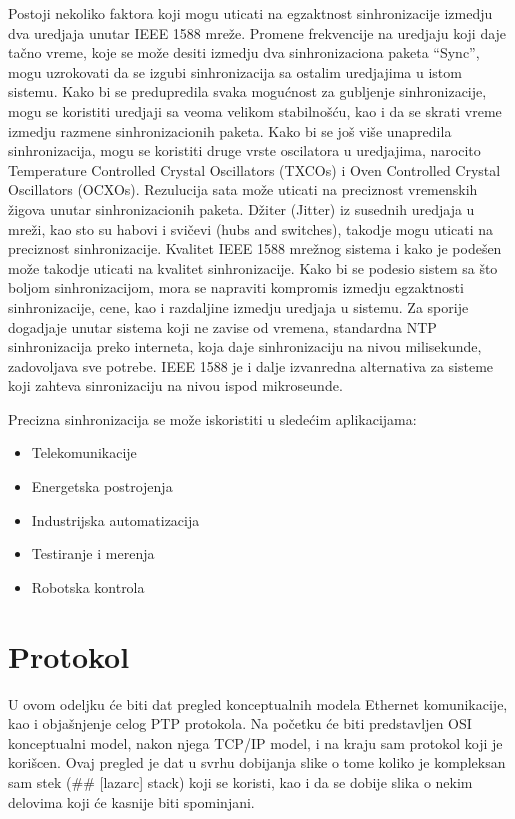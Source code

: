 \documentclass[a4paper,12pt, master]{etf}
\begin{document}
	Postoji nekoliko faktora koji mogu uticati na egzaktnost sinhronizacije 
	izmedju dva	uredjaja unutar IEEE 1588 mre\v{z}e. Promene frekvencije na 
	uredjaju koji daje ta\v{c}no vreme,	koje se mo\v{z}e desiti izmedju dva 
	sinhronizaciona paketa ``Sync'', mogu uzrokovati da se izgubi 
	sinhronizacija sa ostalim uredjajima u istom sistemu. Kako bi se 
	predupredila svaka mogu\'{c}nost za gubljenje sinhronizacije, mogu se 
	koristiti uredjaji sa veoma velikom	stabilno\v{s}\'{c}u, kao i da se skrati 
	vreme izmedju razmene sinhronizacionih paketa. Kako bi se jo\v{s} vi\v{s}e 
	unapredila sinhronizacija, mogu se koristiti druge vrste oscilatora u
	uredjajima, narocito Temperature Controlled Crystal Oscillators (TXCOs) i 
	Oven Controlled Crystal	Oscillators (OCXOs). Rezulucija sata mo\v{z}e 
	uticati na preciznost vremenskih \v{z}igova unutar sinhronizacionih paketa. 
	D\v{z}iter (Jitter) iz susednih uredjaja u mre\v{z}i, kao sto su habovi i
	svi\v{c}evi (hubs and switches), takodje mogu uticati na preciznost 
	sinhronizacije. Kvalitet IEEE 1588 mre\v{z}nog sistema i kako je 
	pode\v{s}en mo\v{z}e takodje uticati na kvalitet sinhronizacije. Kako bi
	se podesio sistem sa \v{s}to boljom sinhronizacijom, mora se napraviti 
	kompromis izmedju egzaktnosti sinhronizacije, cene, kao i razdaljine 
	izmedju uredjaja u sistemu. Za sporije dogadjaje unutar sistema koji ne 
	zavise od vremena, standardna NTP sinhronizacija preko interneta, koja daje 
	sinhronizaciju na nivou milisekunde, zadovoljava sve potrebe. IEEE 1588 je 
	i dalje izvanredna alternativa za sisteme koji zahteva sinronizaciju na 
	nivou ispod	mikroseunde.

	Precizna sinhronizacija se mo\v{z}e iskoristiti u slede\'{c}im aplikacijama:
	\begin{itemize}
		\item Telekomunikacije
		\item Energetska postrojenja
		\item Industrijska automatizacija
		\item Testiranje i merenja
		\item Robotska kontrola
	\end{itemize}

	\newpage

	\chapter{Protokol}

	U ovom odeljku \'{c}e biti dat pregled konceptualnih modela Ethernet 
	komunikacije, kao i obja\v{s}njenje	celog PTP protokola. Na po\v{c}etku 
	\'{c}e biti predstavljen OSI konceptualni model, nakon njega TCP/IP	model, 
	i na kraju sam protokol koji je kori\v{s}cen. Ovaj pregled je dat u svrhu 
	dobijanja slike o tome koliko je kompleksan sam stek (\#\# [lazarc] stack) 
	koji se koristi, kao i da se dobije slika o nekim delovima koji \'{c}e 
	kasnije biti spominjani.
\end{document}
